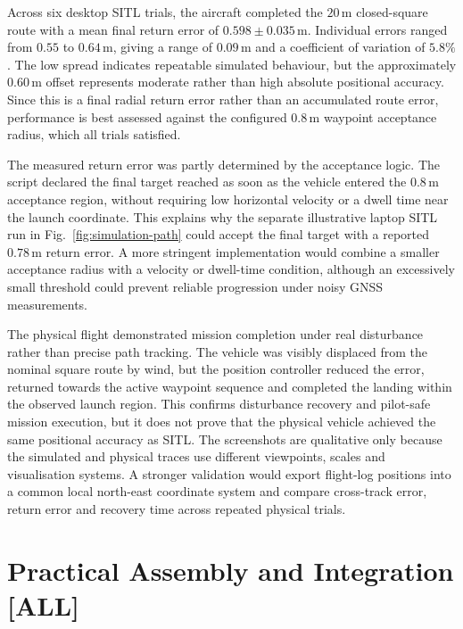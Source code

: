 \documentclass[conference]{IEEEtran}
\begin{document}
Across six desktop SITL trials, the aircraft completed the $20\,\mathrm{m}$ closed-square route with a mean final return error of $0.598\pm0.035\,\mathrm{m}$. Individual errors ranged from $0.55$ to $0.64\,\mathrm{m}$, giving a range of $0.09\,\mathrm{m}$ and a coefficient of variation of $5.8\%$. The low spread indicates repeatable simulated behaviour, but the approximately $0.60\,\mathrm{m}$ offset represents
moderate rather than high absolute positional accuracy. Since this is a final radial return error rather than an accumulated route error, performance is best assessed against the configured $0.8\,\mathrm{m}$ waypoint acceptance radius, which all trials satisfied.

The measured return error was partly determined by the acceptance logic. The script declared the final target reached as soon as the vehicle entered the $0.8\,\mathrm{m}$ acceptance region, without requiring low horizontal velocity or a dwell time near the launch coordinate. This explains why the separate illustrative laptop SITL run in Fig.~\ref{fig:simulation-path} could accept the final target with a reported $0.78\,\mathrm{m}$ return error. A more stringent
implementation would combine a smaller acceptance radius with a velocity or dwell-time condition, although an excessively small threshold could prevent reliable progression under noisy GNSS measurements.

The physical flight demonstrated mission completion under real disturbance rather than precise path tracking. The vehicle was visibly displaced from the nominal square route by wind, but the position controller reduced the error,
returned towards the active waypoint sequence and completed the landing within the observed launch region. This confirms disturbance recovery and pilot-safe mission execution, but it does not prove that the physical vehicle achieved the same positional accuracy as SITL. The screenshots are qualitative only because the simulated and physical traces use different viewpoints, scales and visualisation systems. A stronger validation would export flight-log positions into a common local north-east coordinate system and compare cross-track error, return error and recovery time across repeated physical trials.

\section{Practical Assembly and Integration [ALL]}
\end{document}
